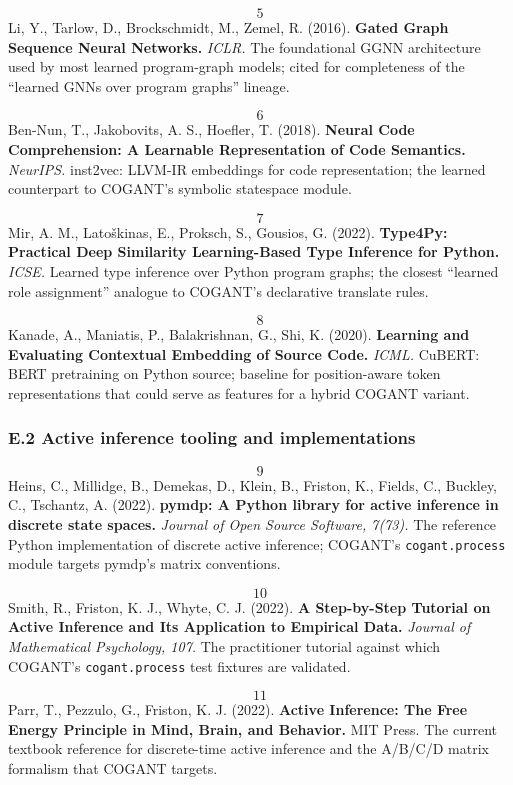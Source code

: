 \documentclass[
]{article}
\begin{document}
\[5\] Li, Y., Tarlow, D., Brockschmidt, M., Zemel, R. (2016).
\textbf{Gated Graph Sequence Neural Networks.} \emph{ICLR.} The
foundational GGNN architecture used by most learned program-graph
models; cited for completeness of the ``learned GNNs over program
graphs'' lineage.

\[6\] Ben-Nun, T., Jakobovits, A. S., Hoefler, T. (2018).
\textbf{Neural Code Comprehension: A Learnable Representation of Code
Semantics.} \emph{NeurIPS.} inst2vec: LLVM-IR embeddings for code
representation; the learned counterpart to COGANT's symbolic statespace
module.

\[7\] Mir, A. M., Latoškinas, E., Proksch, S., Gousios, G. (2022).
\textbf{Type4Py: Practical Deep Similarity Learning-Based Type Inference
for Python.} \emph{ICSE.} Learned type inference over Python program
graphs; the closest ``learned role assignment'' analogue to COGANT's
declarative translate rules.

\[8\] Kanade, A., Maniatis, P., Balakrishnan, G., Shi, K. (2020).
\textbf{Learning and Evaluating Contextual Embedding of Source Code.}
\emph{ICML.} CuBERT: BERT pretraining on Python source; baseline for
position-aware token representations that could serve as features for a
hybrid COGANT variant.

\subsubsection{E.2 Active inference tooling and
implementations}\label{e.2-active-inference-tooling-and-implementations}

\[9\] Heins, C., Millidge, B., Demekas, D., Klein, B., Friston, K.,
Fields, C., Buckley, C., Tschantz, A. (2022). \textbf{pymdp: A Python
library for active inference in discrete state spaces.} \emph{Journal of
Open Source Software, 7(73).} The reference Python implementation of
discrete active inference; COGANT's \texttt{cogant.process} module
targets pymdp's matrix conventions.

\[10\] Smith, R., Friston, K. J., Whyte, C. J. (2022). \textbf{A
Step-by-Step Tutorial on Active Inference and Its Application to
Empirical Data.} \emph{Journal of Mathematical Psychology, 107.} The
practitioner tutorial against which COGANT's \texttt{cogant.process}
test fixtures are validated.

\[11\] Parr, T., Pezzulo, G., Friston, K. J. (2022). \textbf{Active
Inference: The Free Energy Principle in Mind, Brain, and Behavior.} MIT
Press. The current textbook reference for discrete-time active inference
and the A/B/C/D matrix formalism that COGANT targets.
\end{document}
